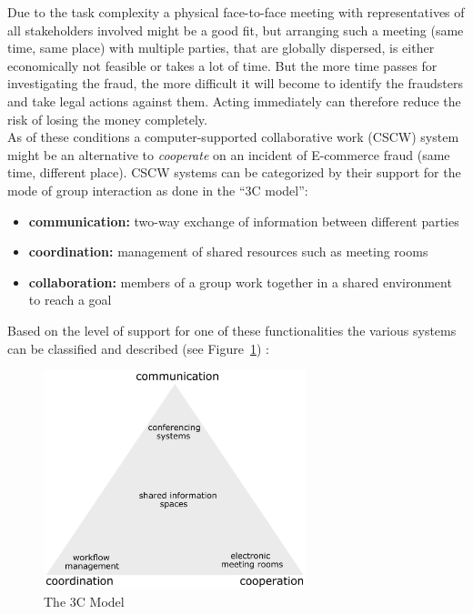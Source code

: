 Due to the task complexity a physical face-to-face meeting with representatives of all stakeholders involved might be a good fit, but arranging such a meeting (same time, same place) with multiple parties, that are globally dispersed, is either economically not feasible or takes a lot of time. But the more time passes for investigating the fraud, the more difficult it will become to identify the fraudsters and take legal actions against them. Acting immediately can therefore reduce the risk of losing the money completely. \\

As of these conditions a computer-supported collaborative work (\gls{CSCW}) system might be an alternative to \textit{cooperate} on an incident of \gls{E-commerce} fraud (same time, different place). \gls{CSCW} systems can be categorized by their support for the mode of group interaction as done in the ``3C model'': \@

\begin{itemize}
    \item\textbf{communication:} two-way exchange of information between different parties
    \item\textbf{coordination:} management of shared resources such as meeting rooms
    \item\textbf{collaboration:} members of a group work together in a shared environment to reach a goal
\end{itemize}

Based on the level of support for one of these functionalities the various systems can be classified and described (see Figure~\ref{fig:images_3C_model}) \citep{Koch2008}: \@

\begin{figure}[H]
	\centering
		\includegraphics[height=2.5in]{images/3C-model.pdf}
	\caption{The 3C Model \citep{Koch2008}}
\label{fig:images_3C_model}
\end{figure}

